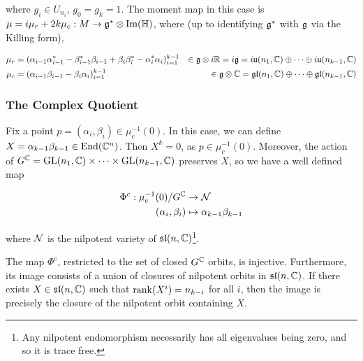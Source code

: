 \documentclass{article}
\renewcommand{\sl}{\mfs\mfl}
\begin{document}
where \(g_i \in U_{n_i}\), \(g_0 = g_k = 1\). The moment map in this case is \(\mu = i\mu_r + 2k\mu_c : M \to \mathfrak{g}^* \otimes \Im(\mathbb{H})\), where (up to identifying \(\mathfrak{g}^*\) with \(\mathfrak{g}\) via the Killing form),

\begin{align*}
    \mu_r &= (\alpha_{i-1}\alpha_{i-1}^* - \beta_{i-1}^*\beta_{i-1} + \beta_i\beta_i^* - \alpha_i^*\alpha_i)_{i=1}^{k-1} &\in \mathfrak{g} \otimes i\mathbb{R} = i\mathfrak{g} = i\mathfrak{u}(n_1, \mathbb{C}) \oplus \cdots \oplus i\mathfrak{u}(n_{k-1}, \mathbb{C}) \\
    \mu_c &= (\alpha_{i-1}\beta_{i-1} - \beta_i\alpha_i)_{i=1}^{k-1} &\in \mathfrak{g} \otimes \mathbb{C} = \mathfrak{g}\mathfrak{l}(n_1, \mathbb{C}) \oplus \cdots \oplus \mathfrak{g}\mathfrak{l}(n_{k-1}, \mathbb{C})
\end{align*}

\subsubsection{The Complex Quotient}

Fix a point \(p = (\alpha_i, \beta_i) \in \mu_c^{-1}(0)\). In this case, we can define \(X = \alpha_{k-1}\beta_{k-1} \in \operatorname{End}(\mathbb{C}^n)\). Then \(X^k = 0\), as \(p \in \mu_c^{-1}(0)\). Moreover, the action of \(G^{\mathbb{C}} = \operatorname{GL}(n_1, \mathbb{C}) \times \cdots \times \operatorname{GL}(n_{k-1}, \mathbb{C})\) preserves \(X\), so we have a well defined map

\begin{align*}
    \Phi^c : \mu_c^{-1}(0) / G^{\mathbb{C}} &\to \mathcal{N} \\
    (\alpha_i, \beta_i) &\mapsto \alpha_{k-1}\beta_{k-1}
\end{align*}

where \(\mathcal{N}\) is the nilpotent variety of \(\sl(n, \C)\)\footnote{Any nilpotent endomorphism necessarily has all eigenvalues being zero, and so it is trace free.}.

\begin{theorem}
    \label{thm:cx-quot-sln}
    The map \(\Phi^c\), restricted to the set of closed \(G^{\mathbb{C}}\) orbits, is injective. Furthermore, its image consists of a union of closures of nilpotent orbits in \(\sl(n, \C)\). If there exists \(X \in \sl(n, \C)\) such that \(\rank(X^i) = n_{k-i}\) for all \(i\), then the image is precisely the closure of the nilpotent orbit containing \(X\).
\end{theorem}
\end{document}
